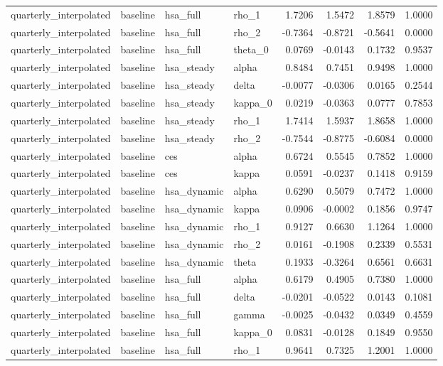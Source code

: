 \begin{tabular}{llllrrrr}
quarterly\_interpolated & baseline & hsa\_full & rho\_1 & 1.7206 & 1.5472 & 1.8579 & 1.0000 \\
quarterly\_interpolated & baseline & hsa\_full & rho\_2 & -0.7364 & -0.8721 & -0.5641 & 0.0000 \\
quarterly\_interpolated & baseline & hsa\_full & theta\_0 & 0.0769 & -0.0143 & 0.1732 & 0.9537 \\
quarterly\_interpolated & baseline & hsa\_steady & alpha & 0.8484 & 0.7451 & 0.9498 & 1.0000 \\
quarterly\_interpolated & baseline & hsa\_steady & delta & -0.0077 & -0.0306 & 0.0165 & 0.2544 \\
quarterly\_interpolated & baseline & hsa\_steady & kappa\_0 & 0.0219 & -0.0363 & 0.0777 & 0.7853 \\
quarterly\_interpolated & baseline & hsa\_steady & rho\_1 & 1.7414 & 1.5937 & 1.8658 & 1.0000 \\
quarterly\_interpolated & baseline & hsa\_steady & rho\_2 & -0.7544 & -0.8775 & -0.6084 & 0.0000 \\
quarterly\_interpolated & baseline & ces & alpha & 0.6724 & 0.5545 & 0.7852 & 1.0000 \\
quarterly\_interpolated & baseline & ces & kappa & 0.0591 & -0.0237 & 0.1418 & 0.9159 \\
quarterly\_interpolated & baseline & hsa\_dynamic & alpha & 0.6290 & 0.5079 & 0.7472 & 1.0000 \\
quarterly\_interpolated & baseline & hsa\_dynamic & kappa & 0.0906 & -0.0002 & 0.1856 & 0.9747 \\
quarterly\_interpolated & baseline & hsa\_dynamic & rho\_1 & 0.9127 & 0.6630 & 1.1264 & 1.0000 \\
quarterly\_interpolated & baseline & hsa\_dynamic & rho\_2 & 0.0161 & -0.1908 & 0.2339 & 0.5531 \\
quarterly\_interpolated & baseline & hsa\_dynamic & theta & 0.1933 & -0.3264 & 0.6561 & 0.6631 \\
quarterly\_interpolated & baseline & hsa\_full & alpha & 0.6179 & 0.4905 & 0.7380 & 1.0000 \\
quarterly\_interpolated & baseline & hsa\_full & delta & -0.0201 & -0.0522 & 0.0143 & 0.1081 \\
quarterly\_interpolated & baseline & hsa\_full & gamma & -0.0025 & -0.0432 & 0.0349 & 0.4559 \\
quarterly\_interpolated & baseline & hsa\_full & kappa\_0 & 0.0831 & -0.0128 & 0.1849 & 0.9550 \\
quarterly\_interpolated & baseline & hsa\_full & rho\_1 & 0.9641 & 0.7325 & 1.2001 & 1.0000 \\

\end{tabular}
